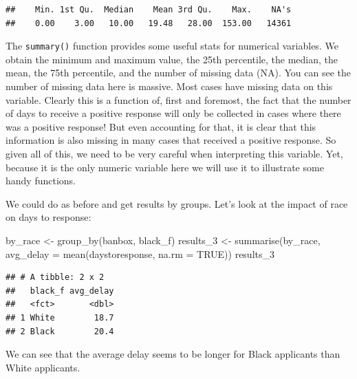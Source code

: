 \documentclass[
]{book}
\newenvironment{Shaded}{\begin{snugshade}}{\end{snugshade}}
\newcommand{\AttributeTok}[1]{\textcolor[rgb]{0.77,0.63,0.00}{#1}}
\newcommand{\ConstantTok}[1]{\textcolor[rgb]{0.00,0.00,0.00}{#1}}
\newcommand{\FunctionTok}[1]{\textcolor[rgb]{0.00,0.00,0.00}{#1}}
\newcommand{\NormalTok}[1]{#1}
\newcommand{\OtherTok}[1]{\textcolor[rgb]{0.56,0.35,0.01}{#1}}
\newcommand{\SpecialCharTok}[1]{\textcolor[rgb]{0.00,0.00,0.00}{#1}}
\begin{document}
\begin{Shaded}
\end{Shaded}

\begin{verbatim}
##    Min. 1st Qu.  Median    Mean 3rd Qu.    Max.    NA's 
##    0.00    3.00   10.00   19.48   28.00  153.00   14361
\end{verbatim}

The \texttt{summary()} function provides some useful stats for numerical variables. We obtain the minimum and maximum value, the 25th percentile, the median, the mean, the 75th percentile, and the number of missing data (NA). You can see the number of missing data here is massive. Most cases have missing data on this variable. Clearly this is a function of, first and foremost, the fact that the number of days to receive a positive response will only be collected in cases where there was a positive response! But even accounting for that, it is clear that this information is also missing in many cases that received a positive response. So given all of this, we need to be very careful when interpreting this variable. Yet, because it is the only numeric variable here we will use it to illustrate some handy functions.

We could do as before and get results by groups. Let's look at the impact of race on days to response:

\begin{Shaded}
\begin{Highlighting}[]
\NormalTok{by\_race }\OtherTok{\textless{}{-}} \FunctionTok{group\_by}\NormalTok{(banbox, black\_f)}
\NormalTok{results\_3 }\OtherTok{\textless{}{-}} \FunctionTok{summarise}\NormalTok{(by\_race,}
  \AttributeTok{avg\_delay =} \FunctionTok{mean}\NormalTok{(daystoresponse, }\AttributeTok{na.rm =} \ConstantTok{TRUE}\NormalTok{))}
\NormalTok{results\_3}
\end{Highlighting}
\end{Shaded}

\begin{verbatim}
## # A tibble: 2 x 2
##   black_f avg_delay
##   <fct>       <dbl>
## 1 White        18.7
## 2 Black        20.4
\end{verbatim}

We can see that the average delay seems to be longer for Black applicants than White applicants.
\end{document}
